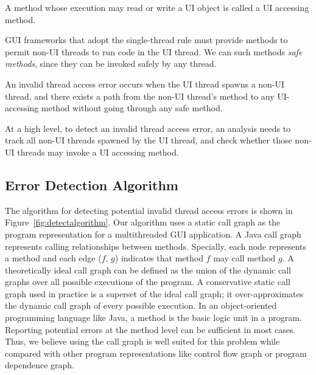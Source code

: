  { A method
whose execution may read or write a UI object is called a UI accessing method.}\vspace{1mm}

 {GUI frameworks that
adopt the single-thread rule must provide methods to permit non-UI threads
to run code in the UI thread. We can such methods \textit{safe methods}, since
they can be invoked safely by any thread.}\vspace{1mm}

 {An invalid
thread access error occurs when the UI thread spawns a non-UI thread, and there
exists a path from the non-UI thread's  method to any UI-accessing method
without going through any safe method. }\vspace{2mm}

At a high level, to detect an invalid thread access error, an analysis needs to track all
non-UI threads spawned by the UI thread, and check whether those non-UI threads
may invoke a UI accessing method.

\subsection{Error Detection Algorithm}

The algorithm for detecting potential invalid thread access errors
is shown in Figure~\ref{fig:detectalgorithm}. Our algorithm uses a
static call graph as the program representation for a multithreaded
GUI application. A Java call graph represents calling relationships
between methods. Specially, each node represents a method and each
edge ($f$, $g$) indicates that method $f$ may call method $g$.
A theoretically ideal call graph can be defined as the union of the
dynamic call graphs over all possible executions of the program. 
A conservative static call graph used in practice is a superset of
the ideal call graph; it over-approximates the
dynamic call graph of every possible execution. 
In an object-oriented programming language like
Java, a method is the basic logic unit in a program. Reporting
potential errors at the method level can be sufficient in most cases.
Thus, we believe using the call graph is well suited for this problem while
compared with other program representations like control flow graph or
program dependence graph. 


